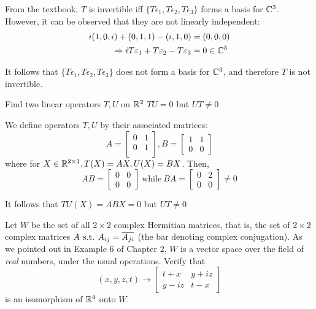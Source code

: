 \documentclass[a4paper, 10pt]{article}
\begin{document}
\begin{solution}
    From the textbook, \(T\) is invertible iff \(\{T\epsilon_1, T\epsilon_2, T\epsilon_3\}\) forms a basis for \(\mathbb{C}^3\). However, it can be observed that they are not linearly independent: \begin{align*}
        i(1, 0, i) + (0, 1, 1) - (i, 1, 0) &= (0, 0, 0) \\
        \Rightarrow iT\varepsilon_1 + T\varepsilon_2 - T\varepsilon_3 &= 0 \in \mathbb{C}^3
    \end{align*}

    It follows that \(\{T\epsilon_1, T\epsilon_2, T\epsilon_3\}\) does not form a basis for \(\mathbb{C}^3\), and therefore \(T\) is not invertible.
\end{solution}
\begin{problem} 
    Find two linear operators \(T, U\) on \(\mathbb{R}^2\) \st \(TU = 0\) but \(UT \neq 0\)
\end{problem}
\begin{solution}
    We define operators \(T, U\) by their associated matrices: \[
    A = \left[\begin{array}{cc}
    0 & 1 \\
    0 & 1 \\
    \end{array}\right], B = \left[\begin{array}{cc}
    1 & 1 \\
    0 & 0
    \end{array}\right]
    \]
    where for \(X \in \mathbb{R}^{2\times 1}, T(X) = AX, U(X) = BX\). Then, \[
    AB = \left[\begin{array}{cc}
    0 & 0 \\
    0 & 0
    \end{array}\right] \:\text{while}\: BA = \left[\begin{array}{cc}
        0 & 2 \\
        0 & 0
        \end{array}\right] \neq 0
    \]

    It follows that \(TU(X) = ABX = 0\) but \(UT \neq 0\)
\end{solution}
\begin{problem} 
    Let \(W\) be the set of all \(2 \times 2\) complex Hermitian matrices, that is, the set of \(2 \times 2\) complex matrices \(A \hspace*{4pt}\text{s.t.}\hspace*{4pt} A_{ij} = \overline{A_{ji}}\) (the bar denoting complex conjugation). As we pointed out in Example 6 of Chapter 2, \(W\) is a vector space over the field of \textit{real} numbers, under the usual operations. Verify that \[
    (x, y, z, t) \to \left[\begin{array}{cc}
    t + x & y + iz \\
    y - iz & t -x
    \end{array}\right]
    \]
    is an isomorphism of \(\mathbb{R}^4\) onto \(W\).
\end{problem}
\end{document}
